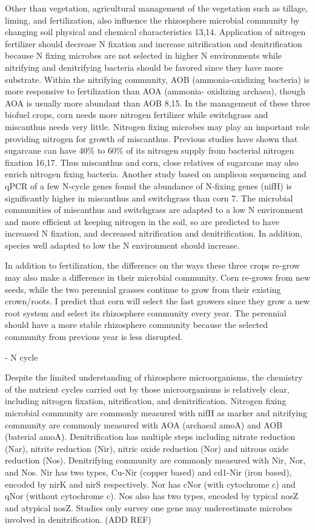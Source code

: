 \documentclass[12pt]{article}
\begin{document}
Other than vegetation, agricultural management of the vegetation such as tillage, liming, and fertilization, also influence the rhizosphere microbial community by changing soil physical and chemical characteristics 13,14. Application of nitrogen fertilizer should decrease N fixation and increase nitrification and denitrification because N fixing microbes are not selected in higher N environments while nitrifying and denitrifying bacteria should be favored since they have more substrate. Within the nitrifying community, AOB (ammonia-oxidizing bacteria) is more responsive to fertilization than AOA (ammonia- oxidizing archaea), though AOA is usually more abundant than AOB 8,15. In the management of these three biofuel crops, corn needs more nitrogen fertilizer while switchgrass and miscanthus needs very little. Nitrogen fixing microbes may play an important role providing nitrogen for growth of miscanthus. Previous studies have shown that sugarcane can have 40\% to 60\% of its nitrogen supply from bacterial nitrogen fixation 16,17. Thus miscanthus and corn, close relatives of sugarcane may also enrich nitrogen fixing bacteria. Another study based on amplicon sequencing and qPCR of a few N-cycle genes found the abundance of N-fixing genes (nifH) is significantly higher in miscanthus and switchgrass than corn 7. The microbial communities of miscanthus and switchgrass are adapted to a low N environment and more efficient at keeping nitrogen in the soil, so are predicted to have increased N fixation, and decreased nitrification and denitrification. In addition, species well adapted to low the N environment should increase.

In addition to fertilization, the difference on the ways these three crops re-grow may also make a difference in their microbial community. Corn re-grows from new seeds, while the two perennial grasses continue to grow from their existing crown/roots. I predict that corn will select the fast growers since they grow a new root system and select its rhizosphere community every year. The perennial should have a more stable rhizosphere community because the selected community from previous year is less disrupted.

- N cycle

Despite the limited understanding of rhizosphere microorganisms, the chemistry of the nutrient cycles carried out by those microorganisms is relatively clear, including nitrogen fixation, nitrification, and denitrification. Nitrogen fixing microbial community are commonly measured with nifH as marker and nitrifying community are commonly measured with AOA (archaeal amoA) and AOB (baterial amoA). Denitrification has multiple steps including nitrate reduction (Nar), nitrite reduction (Nir), nitric oxide reduction (Nor) and nitrous oxide reduction (Nos). Denitrifying community are commonly measured with Nir, Nor, and Nos. Nir has two types, Cu-Nir (copper based) and cd1-Nir (iron based), encoded by nirK and nirS respectively. Nor has cNor (with cytochrome c) and qNor (without cytochrome c). Nos also has two types, encoded by typical nosZ and atypical nosZ. Studies only survey one gene may underestimate microbes involved in denitrification. (ADD REF)
\end{document}
